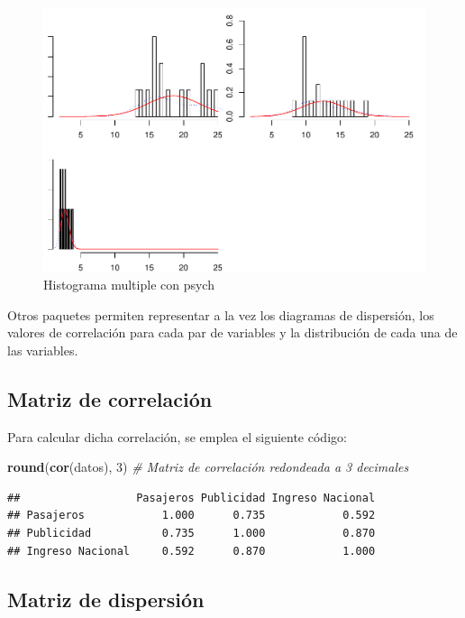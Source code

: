 \documentclass[
]{book}
\newenvironment{Shaded}{\begin{snugshade}}{\end{snugshade}}
\newcommand{\CommentTok}[1]{\textcolor[rgb]{0.56,0.35,0.01}{\textit{#1}}}
\newcommand{\DecValTok}[1]{\textcolor[rgb]{0.00,0.00,0.81}{#1}}
\newcommand{\FunctionTok}[1]{\textcolor[rgb]{0.13,0.29,0.53}{\textbf{#1}}}
\newcommand{\NormalTok}[1]{#1}
\begin{document}
\begin{figure}
\centering
\includegraphics{_main_files/figure-latex/multihist-1.pdf}
\caption{\label{fig:multihist}Histograma multiple con psych}
\end{figure}

Otros paquetes permiten representar a la vez los diagramas de dispersión, los valores de correlación para cada par de variables y la distribución de cada una de las variables.

\hypertarget{matriz-de-correlaciuxf3n}{%
\subsection{Matriz de correlación}\label{matriz-de-correlaciuxf3n}}

Para calcular dicha correlación, se emplea el siguiente código:

\begin{Shaded}
\begin{Highlighting}[]
\FunctionTok{round}\NormalTok{(}\FunctionTok{cor}\NormalTok{(datos), }\DecValTok{3}\NormalTok{) }\CommentTok{\# Matriz de correlación redondeada a 3 decimales}
\end{Highlighting}
\end{Shaded}

\begin{verbatim}
##                  Pasajeros Publicidad Ingreso Nacional
## Pasajeros            1.000      0.735            0.592
## Publicidad           0.735      1.000            0.870
## Ingreso Nacional     0.592      0.870            1.000
\end{verbatim}

\hypertarget{matriz-de-dispersiuxf3n}{%
\subsection{Matriz de dispersión}\label{matriz-de-dispersiuxf3n}}
\end{document}
